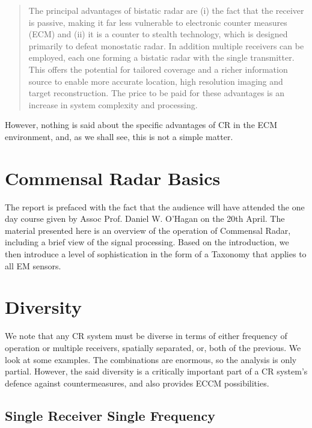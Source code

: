 \documentclass[english, 12pt]{report}
\begin{document}
\begin{quote}The principal advantages
of bistatic radar are (i) the fact that the receiver is passive,
making it far less vulnerable to electronic counter measures
(ECM) and (ii) it is a counter to stealth technology, which
is designed primarily to defeat monostatic radar. In
addition multiple receivers can be employed, each one
forming a bistatic radar with the single transmitter. This
offers the potential for tailored coverage and a richer
information source to enable more accurate location, high
resolution imaging and target reconstruction. The price to
be paid for these advantages is an increase in system
complexity and processing.
\end{quote}

However, nothing is said about the specific advantages of CR in the ECM environment, and, as we shall see, this is not a simple matter.

\section{Commensal Radar Basics}

The report is prefaced with the fact that the audience will have attended the one day course given by Assoc Prof. Daniel W. O'Hagan on the 20th April. The material presented here is an overview of the operation of Commensal Radar, including a brief view of the signal processing. Based on the introduction,  we then introduce a level of sophistication in the form of a Taxonomy that applies to all EM sensors.


\section{Diversity}

We note that any CR system must be diverse in terms of either frequency of operation or multiple receivers, spatially separated, or, both of the previous. We look at some examples. The combinations are enormous, so the analysis is only partial. However, the said diversity is a critically important part of a CR system's defence against countermeasures, and also provides ECCM possibilities. 

\subsection{Single Receiver Single Frequency}
\end{document}

